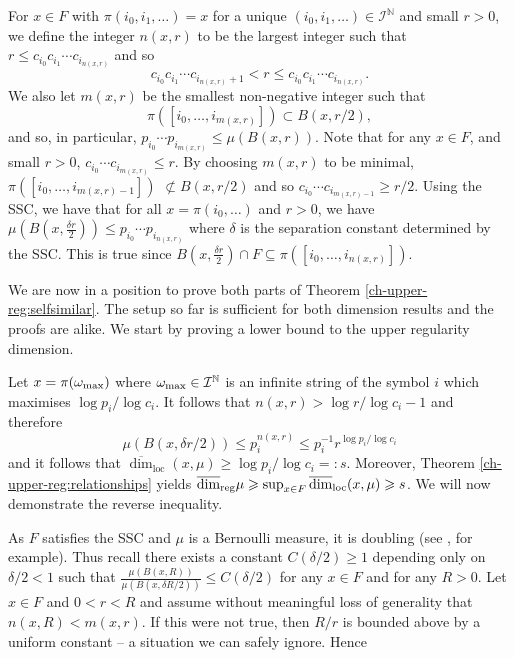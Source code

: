 For $x\in F$ with $\pi(i_0, i_1, \dots)=x$ for a unique $(i_0,i_1,\dots) \in \mathcal{I}^\mathbb{N}$ and small $r>0$, we define the integer $n(x,r)$ to be the largest integer such that $r \le c_{i_0}c_{i_1} \cdots c_{i_{n(x,r)}}$ and so
\[
c_{i_0}c_{i_1} \cdots c_{i_{n(x,r)}+1} < r \le c_{i_0}c_{i_1} \cdots c_{i_{n(x,r)}}.
\]
We also let $m(x,r)$ be the smallest non-negative  integer such that 
$$
\pi([i_0,\ldots, i_{m(x,r)}])\subset B(x,r/2),
$$
and so, in particular,  $p_{i_0}\cdots p_{i_{m(x,r)}} \le \mu (B(x,r))$.  Note that for any $x \in F$, and small $ r>0$,  $c_{i_0} \cdots c_{i_{m(x,r)}} \leq r$. By choosing $m(x,r)$ to be minimal,  $\pi([i_0,\ldots, i_{m(x,r)-1}])$ $\not\subset B(x,r/2)$ and so $c_{i_0} \cdots c_{i_{m(x,r)-1}} \ge r/2$. Using the SSC, we have that for all $x=\pi(i_0,\ldots)$ and  $r>0$, we have $\mu(B(x,\frac{\delta r}{2}))\le p_{i_0}\cdots p_{i_{n(x,r)}}$ where $\delta$ is the separation constant determined by the SSC. This is true since $B(x, \frac{\delta r}{2}) \cap F  \subseteq \pi([i_0,\ldots, i_{n(x,r)}])$.

We are now in a position to prove both parts of Theorem \ref{ch-upper-reg:selfsimilar}. The setup so far is sufficient for both dimension results and the proofs are alike. We start by proving a lower bound to the upper regularity dimension.

Let $x = \pi(\omega_\textup{max})$ where $\omega_\textup{max} \in \mathcal{I}^{\mathbb{N}}$ is an infinite string of the symbol  $i$ which maximises $\log p_i/\log c_i$. It follows that $n(x,r) > \log r / \log {c_i} - 1$ and therefore
\[
\mu(B(x,\delta r/2)) \le p_{i}^{n(x,r)} \leq p_i^{-1} r^{\log p_i/\log c_i}
\]
and it follows that $\overline{\dim}_{\text{loc}}(x,\mu) \geq \log p_i/\log c_i = \colon s$.  Moreover, Theorem \ref{ch-upper-reg:relationships} yields  $ \overline{\dim}_{\textup{reg}} \mu  \geqslant \sup_{x\in F} \overline{\dim}_{\text{loc}}(x,\mu) \geqslant  s$.  We will now demonstrate the reverse inequality. 





As $F$ satisfies the SSC and $\mu$ is a Bernoulli measure, it is doubling (see \cite{olsenformalism}, for example). Thus recall there exists a constant $C(\delta/2) \geq 1$ depending only on $\delta/2 < 1$ such that $\frac{\mu(B(x, R))}{\mu(B(x,\delta R/2))}\le C(\delta/2)$ for any $x\in F$ and for any $R>0$.  Let $x \in F$ and $0<r<R$  and assume without meaningful loss of generality that $n(x,R) < m(x,r)$. If this were not true, then $R/r$ is bounded above by a uniform constant -- a situation we can safely ignore.  Hence

